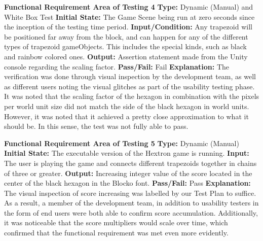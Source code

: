 \documentclass[12pt, titlepage]{article}
\begin{document}
\noindent \textbf{Functional Requirement Area of Testing 4}
\newline
\textbf{Type:} Dynamic (Manual) and White Box Test
\newline
\textbf{Initial State:} The Game Scene being run at zero seconds since the inception of the testing time period. 
\newline 
\textbf{Input/Condition:} Any trapezoid will be positioned far away from the block, and can happen for any of the different types of trapezoid gameObjects. This includes the special kinds, such as black and rainbow colored ones.
\newline 
\textbf{Output:} Assertion statement made from the Unity console regarding the scaling factor. 
\newline 
\textbf{Pass/Fail:} Fail
\newline
\textbf{Explanation:} The verification was done through visual inspection by the development team, as well as different users noting the visual glitches as part of the usability testing phase. It was noted that the scaling factor of the hexagon in combination with the pixels per world unit size did not match the side of the black hexagon in world units. However, it was noted that it achieved a pretty close approximation to what it should be. In this sense, the test was not fully able to pass. \newline \newline

\noindent \textbf{Functional Requirement Area of Testing 5}
\newline
\textbf{Type:} Dynamic (Manual) 
\newline
\textbf{Initial State:} The executable version of the Hextron game is running. 
\newline 
\textbf{Input:} The user is playing the game and connects different trapezoids together in chains of three or greater. 
\newline
\textbf{Output:} Increasing integer value of the score located in the center of the black hexagon in the Blocko font.
\newline
\textbf{Pass/Fail:} Pass
\newline
\textbf{Explanation:} The visual inspection of score increasing was labelled by our Test Plan to suffice. As a result, a member of the development team, in addition to usability testers in the form of end users were both able to confirm score accumulation. Additionally, it was noticeable that the score multipliers would scale over time, which confirmed that the functional requirement was met even more evidently. \newline \newline
\end{document}
